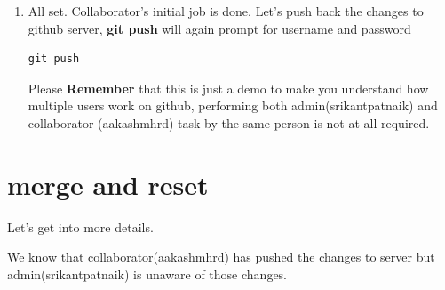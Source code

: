 \documentclass[letterpaper,10pt,english]{sphinxmanual}
\begin{document}
\begin{enumerate}
\item {} 
All set. Collaborator's initial job is done. Let's push back the changes
to github server,  \textbf{git push} will again prompt for username and
password

\begin{Verbatim}[commandchars=\\\{\}]
git push
\end{Verbatim}

Please \textbf{Remember} that this is just a demo to make you understand how multiple
users work on github, performing both admin(srikantpatnaik) and collaborator
(aakashmhrd) task by the same person is not at all required.

\end{enumerate}

\begin{DUlineblock}{0em}
\item[] 
\end{DUlineblock}


\section{merge and reset}
\label{version-control:merge-and-reset}
Let's get into more details.

We know that collaborator(aakashmhrd) has pushed the changes to server but
admin(srikantpatnaik) is unaware of those changes.

\begin{DUlineblock}{0em}
\item[] 
\item[] 
\item[] 
\end{DUlineblock}
\end{document}
